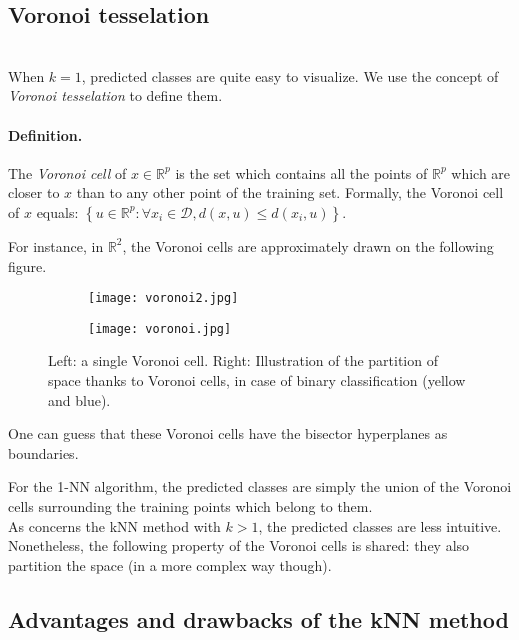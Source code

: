\documentclass[a4paper,12pt]{article}
\newcommand{\dd}{\mathcal{D}}
\begin{document}
\subsection{Voronoi tesselation}\\

When $k=1$, predicted classes are quite easy to visualize. We use the concept of {\em Voronoi tesselation} to define them.

\paragraph{Definition.} The {\em Voronoi cell} of $x \in \mathbb{R}^p$ is the set which contains all the points of $\mathbb{R}^p$ which are closer to $x$ than to any other point of the training set.	
Formally, the Voronoi cell of $x$ equals:
$\left\{ u\in\mathbb{R}^{p}:\forall x_{i}\in\dd,d(x,u)\leq d(x_{i},u)\right\}$.

For instance, in $\mathbb{R}^2$, the Voronoi cells are approximately drawn on the following figure.

\begin{figure}[h]
  \centering
  \begin{subfigure}[c]{0.45\textwidth}
    \texttt{[image: voronoi2.jpg]}
  \end{subfigure} \hfill
  \begin{subfigure}[c]{0.45\textwidth}
    \texttt{[image: voronoi.jpg]}
  \end{subfigure}
\caption{Left: a single Voronoi cell. Right: Illustration of the partition of space thanks to Voronoi cells, in case of binary classification (yellow and blue).}
\end{figure}

One can guess that these Voronoi cells have the bisector hyperplanes as boundaries. 

For the 1-NN algorithm, the predicted classes are simply the union of the Voronoi cells surrounding the training points which belong to them. \\

As concerns the kNN method with $k>1$, the predicted classes are less intuitive. Nonetheless, the following property of the Voronoi cells is shared: they also partition the space (in a more complex way though).

\subsection{Advantages and drawbacks of the kNN method}
\end{document}

